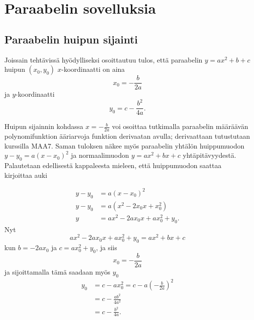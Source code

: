 \section{Paraabelin sovelluksia}


\subsection{Paraabelin huipun sijainti}
Joissain tehtävissä hyödylliseksi osoittautuu tulos, että paraabelin $y = ax^2 +b +c$ huipun $(x_0, y_0)$ $x$-koordinaatti on aina
\[x_0 = - \frac{b}{2a}\]
ja $y$-koordinaatti
\[y_0 = c - \frac{b^2}{4a}.\]


Huipun sijainnin kohdassa $x = - \frac{b}{2a}$ voi osoittaa tutkimalla paraabelin määräävän polynomifunktion ääriarvoja funktion derivaatan avulla; derivaattaan tutustutaan kurssilla MAA7. Saman tuloksen näkee myös paraabelin yhtälön huippumuodon $y - y_0 = a(x- x_0)^2$ ja normaalimuodon $y = ax^2 +bx +c$ yhtäpitävyydestä. Palautetaan edellisestä kappaleesta mieleen, että huippumuodon saattaa kirjoittaa auki

\begin{align*}
y-y_0 &= a(x-x_0)^2 \\
y-y_0 &= a(x^2 - 2x_0x + x_0^2) \\
y &= ax^2 - 2ax_0 x + ax_0^2 +y_0.
\end{align*}
Nyt
\[ax^2 - 2ax_0 x + ax_0^2 +y_0 = ax^2 +bx +c\]
kun $b = -2ax_0$ ja $c = ax_0^2 +y_0$, ja siis
\[x_0 = -\frac{b}{2a}\]
ja sijoittamalla tämä saadaan myös $y_0$
\begin{align*}
y_0 &= c - ax_0^2 = c -a\left(-\frac{b}{2a}\right)^2 \\
&= c - \frac{ab^2}{4a^2} \\
&= c - \frac{b^2}{4a}.
\end{align*}


